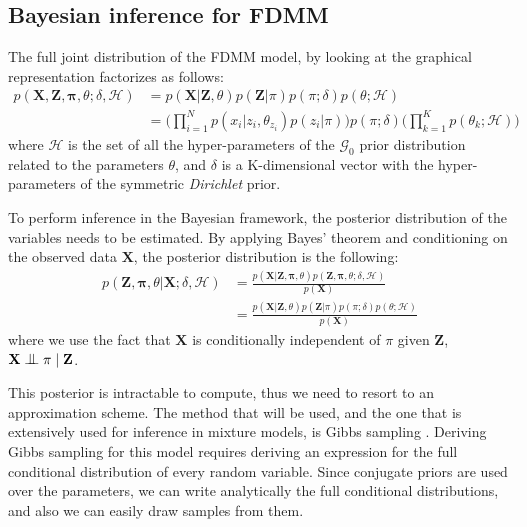 \subsection{Bayesian inference for FDMM} \label{fdmm-gibbs-subsect}
The full joint distribution of the FDMM model, by looking at the graphical representation factorizes as follows:
\begin{equation}
  \begin{aligned}
	p(\mathbf{X},\mathbf{Z},\mathbf{\pi},\theta;\delta,\mathcal{H}) & = p(\mathbf{X}|\mathbf{Z},\theta) p(\mathbf{Z}|\pi) p(\pi ;\delta) p(\theta ; \mathcal{H}) \\
	   & = \bigg(\prod\limits_{i=1}^{N} p(x_{i}|z_{i},\theta_{z_{i}}) p(z_{i}|\pi)\bigg) p(\pi;\delta) \bigg(\prod\limits_{k=1}^{K} p(\theta_{k}; \mathcal{H})\bigg)
  \end{aligned}
\end{equation}
where $\mathcal{H}$ is the set of all the hyper-parameters of the $\mathcal{G}_{0}$ prior distribution related to the parameters $\theta$, and $\delta$ is a K-dimensional vector with the hyper-parameters of the symmetric \emph{Dirichlet} prior. 

To perform inference in the Bayesian framework, the posterior distribution of the variables needs to be estimated. By applying Bayes' theorem and conditioning on the observed data $\mathbf{X}$, the posterior distribution is the following:
\begin{equation}%
  \begin{aligned}
	p(\mathbf{Z},\mathbf{\pi},\theta|\mathbf{X} ;\delta,\mathcal{H}) & = \frac{p(\mathbf{X}|\mathbf{Z},\mathbf{\pi},\theta) p(\mathbf{Z},\mathbf{\pi},\theta ;\delta,\mathcal{H})}{p(\mathbf{X})} \\
	   & = \frac{p(\mathbf{X}|\mathbf{Z},\theta) p(\mathbf{Z}|\pi) p(\pi;\delta) p(\theta; \mathcal{H})} {p(\mathbf{X})}
  \end{aligned}
\end{equation}
where we use the fact that $\mathbf{X}$ is conditionally independent of $\pi$ given $\mathbf{Z}$, \ie $\mathbf{X} \bigCI \pi \mid \mathbf{Z}$.

This posterior is intractable to compute, thus we need to resort to an approximation scheme. The method that will be used, and the one that is extensively used for inference in mixture models, is Gibbs sampling \citep{Geman1984}. Deriving Gibbs sampling for this model requires deriving an expression for the full conditional distribution of every random variable. Since conjugate priors are used over the parameters, we can write analytically the full conditional distributions, and also we can easily draw samples from them.

